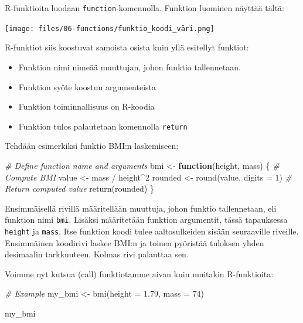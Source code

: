 \documentclass[
]{book}
\newenvironment{Shaded}{\begin{snugshade}}{\end{snugshade}}
\newcommand{\AttributeTok}[1]{\textcolor[rgb]{0.77,0.63,0.00}{#1}}
\newcommand{\CommentTok}[1]{\textcolor[rgb]{0.56,0.35,0.01}{\textit{#1}}}
\newcommand{\ControlFlowTok}[1]{\textcolor[rgb]{0.13,0.29,0.53}{\textbf{#1}}}
\newcommand{\DecValTok}[1]{\textcolor[rgb]{0.00,0.00,0.81}{#1}}
\newcommand{\FloatTok}[1]{\textcolor[rgb]{0.00,0.00,0.81}{#1}}
\newcommand{\FunctionTok}[1]{\textcolor[rgb]{0.00,0.00,0.00}{#1}}
\newcommand{\NormalTok}[1]{#1}
\newcommand{\OtherTok}[1]{\textcolor[rgb]{0.56,0.35,0.01}{#1}}
\newcommand{\SpecialCharTok}[1]{\textcolor[rgb]{0.00,0.00,0.00}{#1}}
\providecommand{\tightlist}{%
  \setlength{\itemsep}{0pt}\setlength{\parskip}{0pt}}
\begin{document}
R-funktioita luodaan \texttt{function}-komennolla. Funktion luominen näyttää tältä:

\texttt{[image: files/06-functions/funktio\_koodi\_väri.png]}

R-funktiot siis koostuvat samoista osista kuin yllä esitellyt funktiot:

\begin{itemize}
\tightlist
\item
  Funktion nimi nimeää muuttujan, johon funktio tallennetaan.
\item
  Funktion syöte koostuu argumenteista
\item
  Funktion toiminnallisuus on R-koodia
\item
  Funktion tulos palautetaan komennolla \texttt{return}
\end{itemize}

Tehdään esimerkiksi funktio BMI:n laskemiseen:

\begin{Shaded}
\begin{Highlighting}[]
\CommentTok{\# Define function name and arguments}
\NormalTok{bmi }\OtherTok{\textless{}{-}} \ControlFlowTok{function}\NormalTok{(height, mass) \{}
  \CommentTok{\# Compute BMI}
\NormalTok{  value }\OtherTok{\textless{}{-}}\NormalTok{ mass }\SpecialCharTok{/}\NormalTok{ height}\SpecialCharTok{\^{}}\DecValTok{2}
\NormalTok{  rounded }\OtherTok{\textless{}{-}} \FunctionTok{round}\NormalTok{(value, }\AttributeTok{digits =} \DecValTok{1}\NormalTok{)}
  \CommentTok{\# Return computed value}
  \FunctionTok{return}\NormalTok{(rounded)}
\NormalTok{\}}
\end{Highlighting}
\end{Shaded}

Ensimmäisellä rivillä määritellään muuttuja, johon funktio tallennetaan, eli funktion nimi \texttt{bmi}. Lisäksi määritetään funktion argumentit, tässä tapauksessa \texttt{height} ja \texttt{mass}. Itse funktion koodi tulee aaltosulkeiden sisään seuraaville riveille. Ensimmäinen koodirivi laskee BMI:n ja toinen pyöristää tuloksen yhden desimaalin tarkkuuteen. Kolmas rivi palauttaa sen.

Voimme nyt kutsua (call) funktiotamme aivan kuin muitakin R-funktioita:

\begin{Shaded}
\begin{Highlighting}[]
\CommentTok{\# Example}
\NormalTok{my\_bmi }\OtherTok{\textless{}{-}} \FunctionTok{bmi}\NormalTok{(}\AttributeTok{height =} \FloatTok{1.79}\NormalTok{, }\AttributeTok{mass =} \DecValTok{74}\NormalTok{)}

\NormalTok{my\_bmi}
\end{Highlighting}
\end{Shaded}
\end{document}
